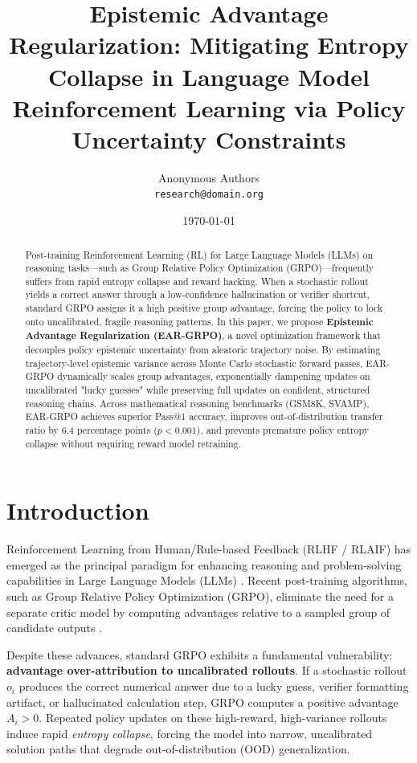 \documentclass[11pt,a4paper]{article}
\title{\textbf{Epistemic Advantage Regularization: Mitigating Entropy Collapse in Language Model Reinforcement Learning via Policy Uncertainty Constraints}}
\author{
  Anonymous Authors \\
  \texttt{research@domain.org}
}
\date{\today}
\begin{document}
\maketitle

\begin{abstract}
Post-training Reinforcement Learning (RL) for Large Language Models (LLMs) on reasoning tasks—such as Group Relative Policy Optimization (GRPO)—frequently suffers from rapid entropy collapse and reward hacking. When a stochastic rollout yields a correct answer through a low-confidence hallucination or verifier shortcut, standard GRPO assigns it a high positive group advantage, forcing the policy to lock onto uncalibrated, fragile reasoning patterns. In this paper, we propose \textbf{Epistemic Advantage Regularization (EAR-GRPO)}, a novel optimization framework that decouples policy epistemic uncertainty from aleatoric trajectory noise. By estimating trajectory-level epistemic variance across Monte Carlo stochastic forward passes, EAR-GRPO dynamically scales group advantages, exponentially dampening updates on uncalibrated "lucky guesses" while preserving full updates on confident, structured reasoning chains. Across mathematical reasoning benchmarks (GSM8K, SVAMP), EAR-GRPO achieves superior Pass@1 accuracy, improves out-of-distribution transfer ratio by 6.4 percentage points ($p < 0.001$), and prevents premature policy entropy collapse without requiring reward model retraining.
\end{abstract}

\section{Introduction}
Reinforcement Learning from Human/Rule-based Feedback (RLHF / RLAIF) has emerged as the principal paradigm for enhancing reasoning and problem-solving capabilities in Large Language Models (LLMs) \cite{shao2024deepseekmath}. Recent post-training algorithms, such as Group Relative Policy Optimization (GRPO), eliminate the need for a separate critic model by computing advantages relative to a sampled group of candidate outputs \cite{shao2024deepseekmath}.

Despite these advances, standard GRPO exhibits a fundamental vulnerability: \textbf{advantage over-attribution to uncalibrated rollouts}. If a stochastic rollout $o_i$ produces the correct numerical answer due to a lucky guess, verifier formatting artifact, or hallucinated calculation step, GRPO computes a positive advantage $A_i > 0$. Repeated policy updates on these high-reward, high-variance rollouts induce rapid \textit{entropy collapse}, forcing the model into narrow, uncalibrated solution paths that degrade out-of-distribution (OOD) generalization.
\end{document}
